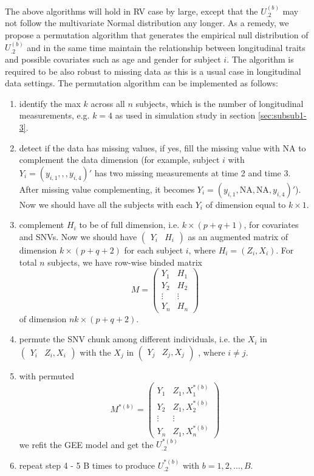 \documentclass[12pt]{article}
\begin{document}
The above algorithms will hold in RV case by large, except that the $U_{.2}^{ (b) }$ may not follow the multivariate Normal distribution any longer. As a remedy, we propose a permutation algorithm that generates the empirical null distribution of $U_{.2}^{ (b) }$ and in the same time maintain the relationship between longitudinal traits and possible covariates such as age and gender for subject $i$. The algorithm is required to be also robust to missing data as this is a usual case in longitudinal data settings. The permutation algorithm can be implemented as follows:
\begin{enumerate}
\item identify the max $k$ across all $n$ subjects, which is the number of longitudinal measurements, e.g. $k = 4$ as used in simulation study in section \ref{sec:subsub1-3}.
\item detect if the data has missing values, if yes, fill the missing value with NA to complement the data dimension (for example, subject $i$ with $Y_{i} = ( y_{i,1},,,y_{i,4} )'$ has two missing measurements at time 2 and time 3. After missing value complementing, it becomes $Y_{i} = ( y_{i,1},\textrm{NA},\textrm{NA},y_{i,4} )'$). Now we should have all the subjects with each $Y_{i}$ of dimension equal to $k \times 1$.  
\item complement $H_i$ to be of full dimension, i.e. $k \times (p + q + 1)$, for covariates and SNVs. Now we should have
$\begin{pmatrix}
Y_i & H_i
\end{pmatrix}$
as an augmented matrix of dimension $k \times (p + q + 2)$ for each subject $i$, where $H_i = (Z_i,X_i)$. For total $n$ subjects, we have row-wise binded matrix
$$
M = 
\begin{pmatrix}
Y_1 & H_1\\
Y_2 & H_2\\
\vdots & \vdots\\
Y_n & H_n
\end{pmatrix}
$$ 
of dimension $nk \times (p + q + 2)$.
\item permute the SNV chunk among different individuals, i.e. the $X_i$ in
$\begin{pmatrix}
Y_i & Z_i,X_i
\end{pmatrix}$ 
with the $X_j$ in 
$\begin{pmatrix}
Y_j & Z_j,X_j
\end{pmatrix}$
, where $i \neq j$. 
\item with permuted 
$$
M^{*(b)} = 
\begin{pmatrix}
Y_1 & Z_1, X_1^{*(b)}\\
Y_2 & Z_1, X_2^{*(b)}\\
\vdots & \vdots\\
Y_n & Z_1, X_n^{*(b)}
\end{pmatrix}
$$
we refit the GEE model and get the $ U_{.2}^{ *(b) } $
\item repeat step 4 - 5 B times to produce $U_{.2}^{ *(b) }$ with $b = 1,2,\ldots,B$.
\end{enumerate}
\end{document}
